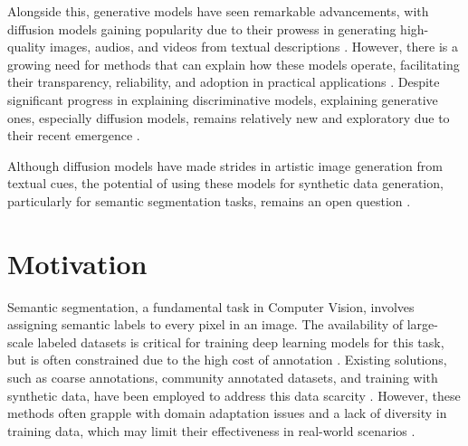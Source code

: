 Alongside this, generative models have seen remarkable advancements, with diffusion models gaining popularity due to their prowess in generating high-quality images, audios, and videos from textual descriptions \cite{Dhariwal2021, Dalle2, rombach2022high, Croitoru2022DiffusionMI, DMSurveyArxivCao}. However, there is a growing need for methods that can explain how these models operate, facilitating their transparency, reliability, and adoption in practical applications \cite{Gerlings2020ReviewingTN}. Despite significant progress in explaining discriminative models, explaining generative ones, especially diffusion models, remains relatively new and exploratory due to their recent emergence \cite{SALEEM2022165}.



Although diffusion models have made strides in artistic image generation from textual cues, the potential of using these models for synthetic data generation, particularly for semantic segmentation tasks, remains an open question \cite{jimaging8110310, kazerouni2022diffusion, DaDiffusion, TabDDPM}.



\section{Motivation}

Semantic segmentation, a fundamental task in Computer Vision, involves assigning semantic labels to every pixel in an image. The availability of large-scale labeled datasets is critical for training deep learning models for this task, but is often constrained due to the high cost of annotation \cite{Lin_2019_ICCV}. Existing solutions, such as coarse annotations, community annotated datasets, and training with synthetic data, have been employed to address this data scarcity \cite{Cityscapes, mapilliary, alcover2021exploring}. However, these methods often grapple with domain adaptation issues and a lack of diversity in training data, which may limit their effectiveness in real-world scenarios \cite{Nowruzi2019HowMR, alcover2021exploring}.

